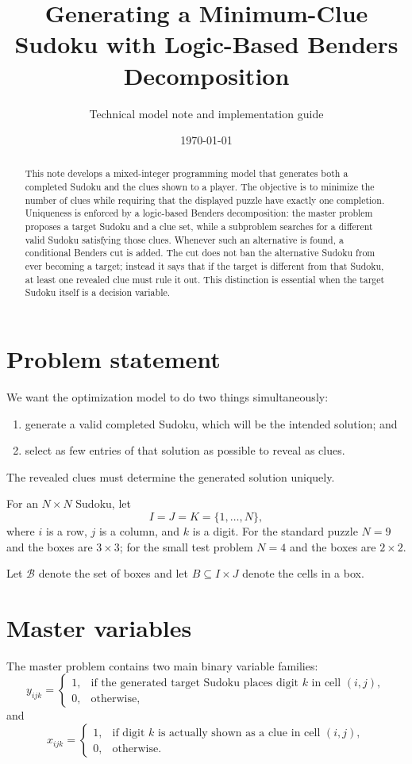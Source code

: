 \documentclass[11pt]{article}
\title{Generating a Minimum-Clue Sudoku with Logic-Based Benders Decomposition}
\author{Technical model note and implementation guide}
\date{\today}
\newcommand{\clue}{x}
\newcommand{\target}{y}
\begin{document}
\maketitle

\begin{abstract}
This note develops a mixed-integer programming model that generates both a completed Sudoku and the clues shown to a player. The objective is to minimize the number of clues while requiring that the displayed puzzle have exactly one completion. Uniqueness is enforced by a logic-based Benders decomposition: the master problem proposes a target Sudoku and a clue set, while a subproblem searches for a different valid Sudoku satisfying those clues. Whenever such an alternative is found, a conditional Benders cut is added. The cut does not ban the alternative Sudoku from ever becoming a target; instead it says that if the target is different from that Sudoku, at least one revealed clue must rule it out. This distinction is essential when the target Sudoku itself is a decision variable.
\end{abstract}

\section{Problem statement}

We want the optimization model to do two things simultaneously:
\begin{enumerate}
    \item generate a valid completed Sudoku, which will be the intended solution; and
    \item select as few entries of that solution as possible to reveal as clues.
\end{enumerate}
The revealed clues must determine the generated solution uniquely.

For an $N\times N$ Sudoku, let
\[
I=J=K=\{1,\ldots,N\},
\]
where $i$ is a row, $j$ is a column, and $k$ is a digit. For the standard puzzle $N=9$ and the boxes are $3\times3$; for the small test problem $N=4$ and the boxes are $2\times2$.

Let $\mathcal{B}$ denote the set of boxes and let $B\subseteq I\times J$ denote the cells in a box.

\section{Master variables}

The master problem contains two main binary variable families:
\[
\target_{ijk}=
\begin{cases}
1,&\text{if the generated target Sudoku places digit $k$ in cell $(i,j)$},\\
0,&\text{otherwise,}
\end{cases}
\]
and
\[
\clue_{ijk}=
\begin{cases}
1,&\text{if digit $k$ is actually shown as a clue in cell $(i,j)$},\\
0,&\text{otherwise.}
\end{cases}
\]
\end{document}
